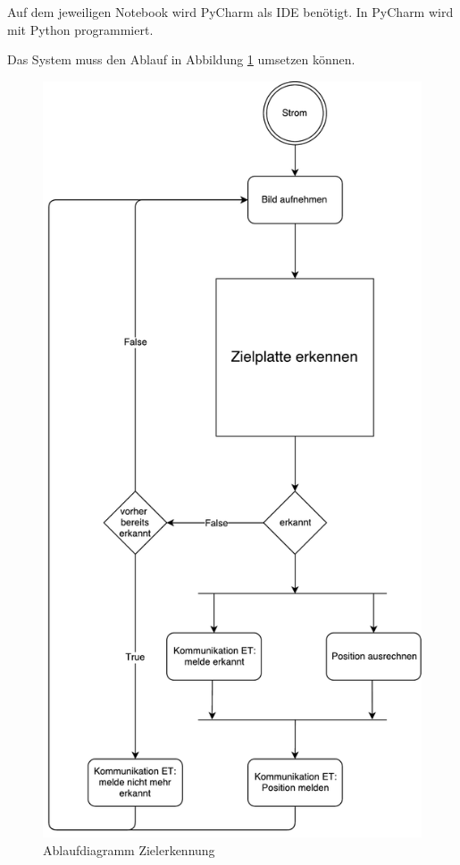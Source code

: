 \documentclass[a4paper]{report}
\begin{document}
Auf dem jeweiligen Notebook wird PyCharm als IDE benötigt. In PyCharm wird mit Python programmiert.

Das System muss den Ablauf in Abbildung \ref{fig:AblaufZielerkennung} umsetzen können.

\begin{figure}[h!]
	\centering
	\includegraphics[keepaspectratio,height=0.8\textheight]{Ablaufdiagramm_ModusOperandi}
	\caption{Ablaufdiagramm Zielerkennung}
	\label{fig:AblaufZielerkennung}
\end{figure}
\end{document}
